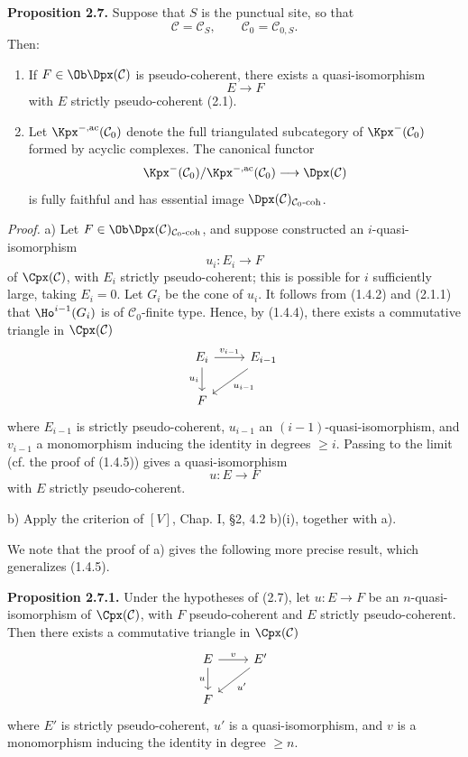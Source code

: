 \textbf{Proposition 2.7.} Suppose that \(S\) is the punctual site, so that
\[
  \mathcal C=\mathcal C_S,\qquad \mathcal C_0=\mathcal C_{0,S}.
\]
Then:
\begin{enumerate}[label=\alph*)]
\item If \(F\in\Ob\Dpx(\mathcal C)\) is pseudo-coherent, there exists a quasi-isomorphism
\[
  E\longrightarrow F
\]
with \(E\) strictly pseudo-coherent (2.1).
\item Let \(\Kpx^{-,\mathrm{ac}}(\mathcal C_0)\) denote the full triangulated subcategory of \(\Kpx^-(\mathcal C_0)\) formed by acyclic complexes. The canonical functor
\[
  \Kpx^-(\mathcal C_0)/\Kpx^{-,\mathrm{ac}}(\mathcal C_0)
  \longrightarrow \Dpx(\mathcal C)
\]
is fully faithful and has essential image \(\Dpx(\mathcal C)_{\mathcal C_0\text{-}\mathrm{coh}}\).
\end{enumerate}

\emph{Proof.} a) Let \(F\in\Ob\Dpx(\mathcal C)_{\mathcal C_0\text{-}\mathrm{coh}}\), and suppose constructed an \(i\)-quasi-isomorphism
\[
  u_i:E_i\longrightarrow F
\]
of \(\Cpx(\mathcal C)\), with \(E_i\) strictly pseudo-coherent; this is possible for \(i\) sufficiently large, taking \(E_i=0\). Let \(G_i\) be the cone of \(u_i\). It follows from (1.4.2) and (2.1.1) that \(\Ho^{i-1}(G_i)\) is of \(\mathcal C_0\)-finite type. Hence, by (1.4.4), there exists a commutative triangle in \(\Cpx(\mathcal C)\)
\[
\begin{tikzcd}
E_i \arrow[r,"v_{i-1}"] \arrow[d,"u_i"'] & E_{i-1} \arrow[dl,"u_{i-1}"]\\
F &
\end{tikzcd}
\]
where \(E_{i-1}\) is strictly pseudo-coherent, \(u_{i-1}\) an \((i-1)\)-quasi-isomorphism, and \(v_{i-1}\) a monomorphism inducing the identity in degrees \(\geq i\). Passing to the limit (cf. the proof of (1.4.5)) gives a quasi-isomorphism
\[
  u:E\longrightarrow F
\]
with \(E\) strictly pseudo-coherent.

b) Apply the criterion of \([V]\), Chap. I, §2, 4.2 b)(i), together with a).

We note that the proof of a) gives the following more precise result, which generalizes (1.4.5).

\textbf{Proposition 2.7.1.} Under the hypotheses of (2.7), let \(u:E\to F\) be an \(n\)-quasi-isomorphism of \(\Cpx(\mathcal C)\), with \(F\) pseudo-coherent and \(E\) strictly pseudo-coherent. Then there exists a commutative triangle in \(\Cpx(\mathcal C)\)
\[
\begin{tikzcd}
E \arrow[r,"v"] \arrow[d,"u"'] & E' \arrow[dl,"u'"]\\
F &
\end{tikzcd}
\]
where \(E'\) is strictly pseudo-coherent, \(u'\) is a quasi-isomorphism, and \(v\) is a monomorphism inducing the identity in degree \(\geq n\).

